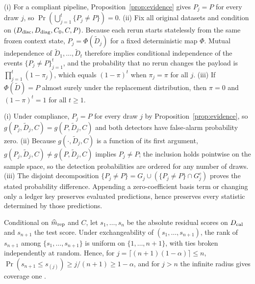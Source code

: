 \begin{pf}
(i) For a compliant pipeline, Proposition~\ref{prop:evidence} gives \(P_j=P\) for every draw \(j\), so \(\Pr(\bigcup_{j=1}^t\{P_j\neq P\})=0\). (ii) Fix all original datasets and condition on \((D_{\rm disc},D_{\rm diag},C_0,C,P)\). Because each rerun starts statelessly from the same frozen context state, \(P_j=\Phi(\widetilde D_j)\) for a fixed deterministic map \(\Phi\). Mutual independence of \(\widetilde D_1,\ldots,\widetilde D_t\) therefore implies conditional independence of the events \(\{P_j\neq P\}_{j=1}^t\), and the probability that no rerun changes the payload is \(\prod_{j=1}^t(1-\pi_j)\), which equals \((1-\pi)^t\) when \(\pi_j=\pi\) for all \(j\). (iii) If \(\Phi(\widetilde D)=P\) almost surely under the replacement distribution, then \(\pi=0\) and \((1-\pi)^t=1\) for all \(t\ge1\).
\end{pf}

\begin{pf}
(i) Under compliance, \(P_j=P\) for every draw \(j\) by Proposition~\ref{prop:evidence}, so \(g(P_j,\widetilde D_j,C)=g(P,\widetilde D_j,C)\) and both detectors have false-alarm probability zero. (ii) Because \(g(\cdot,\widetilde D_j,C)\) is a function of its first argument, \(g(P_j,\widetilde D_j,C)\neq g(P,\widetilde D_j,C)\) implies \(P_j\neq P\); the inclusion holds pointwise on the sample space, so the detection probabilities are ordered for any number of draws. (iii) The disjoint decomposition \(\{P_j\neq P\}=G_j\cup(\{P_j\neq P\}\cap G_j^c)\) proves the stated probability difference. Appending a zero-coefficient basis term or changing only a ledger key preserves evaluated predictions, hence preserves every statistic determined by those predictions.
\end{pf}

\begin{pf}
Conditional on \(\widehat m_{\rm rep}\) and \(C\), let \(s_1,\ldots,s_n\) be the absolute residual scores on \(D_{\rm cal}\) and \(s_{n+1}\) the test score. Under exchangeability of \((s_1,\ldots,s_{n+1})\), the rank of \(s_{n+1}\) among \(\{s_1,\ldots,s_{n+1}\}\) is uniform on \(\{1,\ldots,n+1\}\), with ties broken independently at random. Hence, for \(j=\lceil(n+1)(1-\alpha)\rceil\le n\), \(\Pr(s_{n+1}\le s_{(j)})\ge j/(n+1)\ge 1-\alpha\), and for \(j>n\) the infinite radius gives coverage one \citep{lei2018conformal,barber2023exchangeability}.
\end{pf}

